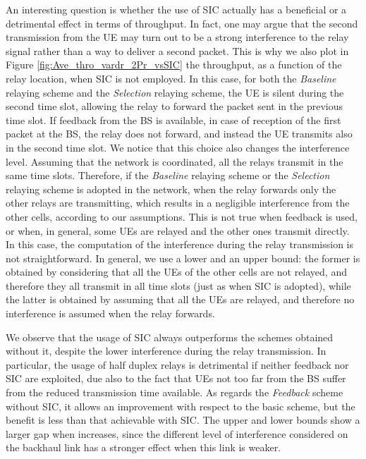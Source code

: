 \documentclass[12pt, letterpaper, onecolumn, draftcls]{IEEEtran}
\begin{document}
An interesting question is whether the use of SIC actually has a beneficial or a detrimental effect in terms of throughput. In fact, one may argue that the second transmission from the UE may turn out to be a strong interference to the relay signal rather than a way to deliver a second packet. This is why we also plot in Figure \ref{fig:Ave_thro_vardr_2Pr_vsSIC} the throughput, as a function of the relay location, when SIC is not employed.
In this case, for both the \textit{Baseline} relaying scheme and the \textit{Selection} relaying scheme, the UE is silent during the second time slot, allowing the relay to forward the packet sent in the previous time slot. If feedback from the BS is available, in case of reception of the first packet at the BS, the relay does not forward, and instead the UE transmits also in the second time slot.
We notice that this choice also changes the interference level. Assuming that the network is coordinated, all the relays transmit in the same time slots. Therefore, if the \textit{Baseline} relaying scheme or the \textit{Selection} relaying scheme is adopted in the network, when the relay forwards only the other relays are transmitting, which results in a negligible interference from the other cells, according to our assumptions.
This is not true when feedback is used, or when, in general, some UEs are relayed and the other ones transmit directly. In this case, the computation of the interference during the relay transmission is not straightforward.
In general, we use a lower and an upper bound: the former is obtained by considering that all the UEs of the other cells are not relayed, and therefore they all transmit in all time slots (just as when SIC is adopted), while the latter is obtained by assuming that all the UEs are relayed, and therefore no interference is assumed when the relay forwards.

We observe that the usage of SIC always outperforms the schemes obtained without it, despite the lower interference during the relay transmission. In particular, the usage of half duplex relays is detrimental if neither feedback nor SIC are exploited, due also to the fact that UEs not too far from the BS suffer from the reduced transmission time available.
As regards the \textit{Feedback} scheme without SIC, it allows an improvement with respect to the basic scheme, but the benefit is less than that achievable with SIC. The upper and lower bounds show a larger gap when  increases, since the different level of interference considered on the backhaul link has a stronger effect when this link is weaker.
\end{document}

